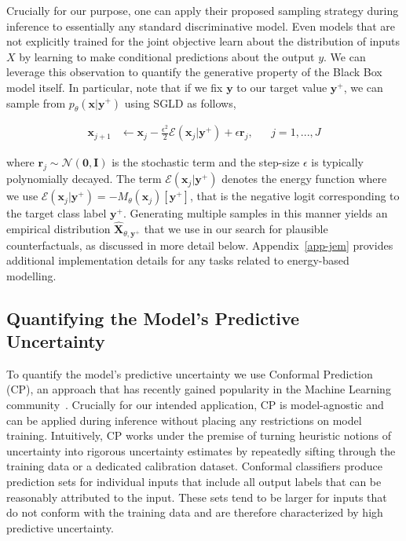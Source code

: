 \documentclass{article}
\begin{document}
Crucially for our purpose, one can apply their proposed sampling strategy during inference to essentially any standard discriminative model. Even models that are not explicitly trained for the joint objective learn about the distribution of inputs $X$ by learning to make conditional predictions about the output $y$. We can leverage this observation to quantify the generative property of the Black Box model itself. In particular, note that if we fix $\mathbf{y}$ to our target value $\mathbf{y}^+$, we can sample from $p_{\theta}(\mathbf{x}|\mathbf{y}^+)$ using SGLD as follows, 

\begin{equation}\label{eq:sgld}
  \begin{aligned}
    \mathbf{x}_{j+1} &\leftarrow \mathbf{x}_j - \frac{\epsilon^2}{2} \mathcal{E}(\mathbf{x}_j|\mathbf{y}^+) + \epsilon \mathbf{r}_j, && j=1,...,J
  \end{aligned}
\end{equation}

where $\mathbf{r}_j \sim \mathcal{N}(\mathbf{0},\mathbf{I})$ is the stochastic term and the step-size $\epsilon$ is typically polynomially decayed. The term $\mathcal{E}(\mathbf{x}_j|\mathbf{y}^+)$ denotes the energy function where we use $\mathcal{E}(\mathbf{x}_j|\mathbf{y}^+)=-M_{\theta}(\mathbf{x}_j)[\mathbf{y}^+]$, that is the negative logit corresponding to the target class label $\mathbf{y}^+$. Generating multiple samples in this manner yields an empirical distribution $\hat{\mathbf{X}}_{\theta,\mathbf{y}^+}$ that we use in our search for plausible counterfactuals, as discussed in more detail below. Appendix~\ref{app-jem} provides additional implementation details for any tasks related to energy-based modelling. 

\subsection{Quantifying the Model's Predictive Uncertainty}

To quantify the model's predictive uncertainty we use Conformal Prediction (CP), an approach that has recently gained popularity in the Machine Learning community~\citep{angelopoulos2021gentle,manokhin2022awesome}. Crucially for our intended application, CP is model-agnostic and can be applied during inference without placing any restrictions on model training. Intuitively, CP works under the premise of turning heuristic notions of uncertainty into rigorous uncertainty estimates by repeatedly sifting through the training data or a dedicated calibration dataset. Conformal classifiers produce prediction sets for individual inputs that include all output labels that can be reasonably attributed to the input. These sets tend to be larger for inputs that do not conform with the training data and are therefore characterized by high predictive uncertainty. 
\end{document}
